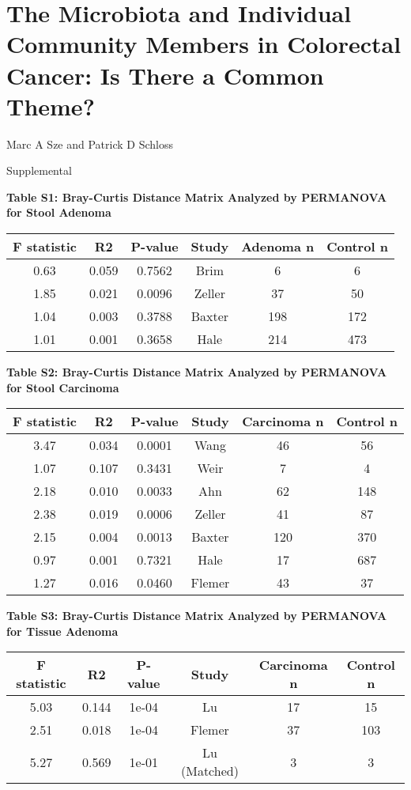 \documentclass[12pt,]{article}
\title{}
\author{}
\date{}
\begin{document}
\section{The Microbiota and Individual Community Members in Colorectal
Cancer: Is There a Common
Theme?}\label{the-microbiota-and-individual-community-members-in-colorectal-cancer-is-there-a-common-theme}

\vspace{10mm}

\begin{center}
Marc A Sze and Patrick D Schloss

\vspace{10mm}

Supplemental
\end{center}

\newpage

\textbf{Table S1: Bray-Curtis Distance Matrix Analyzed by PERMANOVA for
Stool Adenoma}

\begin{longtable}[]{@{}cccccc@{}}
\toprule
F statistic & R2 & P-value & Study & Adenoma n & Control
n\tabularnewline
\midrule
\endhead
0.63 & 0.059 & 0.7562 & Brim & 6 & 6\tabularnewline
1.85 & 0.021 & 0.0096 & Zeller & 37 & 50\tabularnewline
1.04 & 0.003 & 0.3788 & Baxter & 198 & 172\tabularnewline
1.01 & 0.001 & 0.3658 & Hale & 214 & 473\tabularnewline
\bottomrule
\end{longtable}

\newpage

\textbf{Table S2: Bray-Curtis Distance Matrix Analyzed by PERMANOVA for
Stool Carcinoma}

\begin{longtable}[]{@{}cccccc@{}}
\toprule
F statistic & R2 & P-value & Study & Carcinoma n & Control
n\tabularnewline
\midrule
\endhead
3.47 & 0.034 & 0.0001 & Wang & 46 & 56\tabularnewline
1.07 & 0.107 & 0.3431 & Weir & 7 & 4\tabularnewline
2.18 & 0.010 & 0.0033 & Ahn & 62 & 148\tabularnewline
2.38 & 0.019 & 0.0006 & Zeller & 41 & 87\tabularnewline
2.15 & 0.004 & 0.0013 & Baxter & 120 & 370\tabularnewline
0.97 & 0.001 & 0.7321 & Hale & 17 & 687\tabularnewline
1.27 & 0.016 & 0.0460 & Flemer & 43 & 37\tabularnewline
\bottomrule
\end{longtable}

\newpage

\textbf{Table S3: Bray-Curtis Distance Matrix Analyzed by PERMANOVA for
Tissue Adenoma}

\begin{longtable}[]{@{}cccccc@{}}
\toprule
F statistic & R2 & P-value & Study & Carcinoma n & Control
n\tabularnewline
\midrule
\endhead
5.03 & 0.144 & 1e-04 & Lu & 17 & 15\tabularnewline
2.51 & 0.018 & 1e-04 & Flemer & 37 & 103\tabularnewline
5.27 & 0.569 & 1e-01 & Lu (Matched) & 3 & 3\tabularnewline
\bottomrule
\end{longtable}
\end{document}
